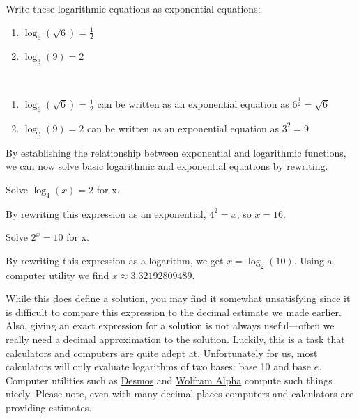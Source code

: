 \begin{example}
    Write these logarithmic equations as exponential equations:
    \begin{enumerate}
        \item $\log_6 (\sqrt{6}) = \frac{1}{2}$
        \item $\log_3 (9) = 2$
    \end{enumerate}
\end{example}
\begin{solution} ~

    \begin{enumerate}
        \item $\log_6 (\sqrt{6}) = \frac{1}{2}$ can be written as an exponential equation as $6^{\frac{1}{2}} = \sqrt{6}$
        \item $\log_3 (9) = 2$ can be written as an exponential equation as $3^2 = 9$
    \end{enumerate}
\end{solution}

By establishing the relationship between exponential and logarithmic functions, we can now solve basic logarithmic and exponential equations by rewriting.

\begin{example}
    Solve $\log_4(x) = 2$ for x.
\end{example}
\begin{solution}
    By rewriting this expression as an exponential, $4^2 = x$, so $x = 16$.
\end{solution}

\begin{example}
    Solve $2^x = 10$ for x.
\end{example}
\begin{solution}
    By rewriting this expression as a logarithm, we get $x = \log_2(10)$. Using a computer utility we find $x \approx 3.32192809489$.

    While this does define a solution, you may find it somewhat unsatisfying since it is difficult to compare this expression to the decimal estimate we made earlier. Also, giving an exact expression for a solution is not always useful—often we really need a decimal approximation to the solution. Luckily, this is a task that calculators and computers are quite adept at. Unfortunately for us, most calculators will only evaluate logarithms of two bases: base 10 and base $e$. Computer utilities such as \href{https://www.desmos.com/calculator}{Desmos} and \href{https://www.wolframalpha.com/}{Wolfram Alpha} compute such things nicely. Please note, even with many decimal places computers and calculators are providing estimates.
\end{solution}

